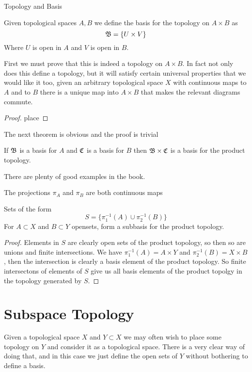 \begin{chapter}{Topology and Basis}
    
    \begin{defn}
        Given topological spaces $A, B$ we define the basis for the topology on $A \times B$ as 
        \[\mathfrak{B} = \{U \times V \}\]
        Where $U$ is open in $A$ and $V$ is open in $B$. 
    \end{defn}

    First we must prove that this is indeed a topology on $A \times B$. In fact not only does this define a topology, but it will satisfy certain universal properties that 
    we would like it too, given an arbitrary topological space $X$ with continuous maps to $A$ and to $B$ there is a unique map into $A \times B$ that makes the relevant diagrams commute.

    
    \begin{proof}
        place
    \end{proof}
    The next theorem is obvious and the proof is trivial

    
    \begin{thm}
        If $\mathfrak{B}$ is a basis for $A$ and $\mathfrak{C}$ is a basis for $B$ then $\mathfrak{B} \times \mathfrak{C}$ is a basis for the product topology. 
    \end{thm}

    There are plenty of good examples in the book. 


   
   \begin{thm}
    The projections $\pi_A$ and $\pi_B$ are both continuous maps 
   \end{thm}

   \begin{thm}
    Sets of the form 
    \[S = \{\pi^{-1}_1(A) \cup \pi^{-1}_2(B) \}\]
    For $A \subset X$ and $B \subset Y$ opensets, form a subbasis for the product topology. 
   \end{thm}

   \begin{proof}
    Elements in $S$ are clearly open sets of the product topology, so then so are unions and finite intersections. 
    We have $\pi^{-1}_1(A) = A \times Y$ and $\pi^{-1}_2(B) = X \times B$, then the intersection is clearly a basis element of the product topology. So finite intersectons of elements of $S$ give us all basis elements of the product topolgy in the 
    topology generated by $S$. 
   \end{proof}

   \section{Subspace Topology}
   Given a topological space $X$ and $Y \subset X$ we may often wish to place some topology on $Y$ and consider it as a topological space. There is a very clear way of doing that, 
   and in this case we just define the open sets of $Y$ without bothering to define a basis. 


\end{chapter}
